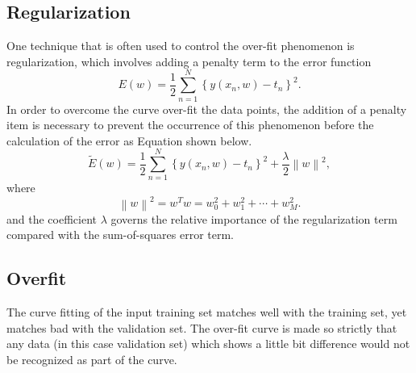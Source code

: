 \documentclass[letterpaper,12pt]{article}
\numberwithin{equation}{section}
\begin{document}



\subsection{Regularization}
One technique that is often used to control the over-fit phenomenon is regularization, which involves adding a penalty term to the error function\cite{bishop2006pattern}
\begin{equation}\label{1.1}
E(w) = \frac{1}{2}\sum_{n=1}^{N}\left\{y(x_n,w)-t_n\right\}^2.
\end{equation}
In order to overcome the curve over-fit the data points, the addition of a penalty item is necessary to prevent the occurrence of this phenomenon before the calculation of the error as Equation shown below.
\begin{equation}\label{1.2}
\widetilde{E}(w) = \frac{1}{2}\sum_{n=1}^{N}\left\{y(x_n,w)-t_n\right\}^2+\frac{\lambda}{2}{\left\|{w}\right\|}^2,
\end{equation}
where
\begin{equation}\label{1.3}
{\left\|{w}\right\|}^2=w^Tw=w_{0}^{2}+w_{1}^{2}+\cdots+w_{M}^{2}.
\end{equation}
and the coefficient $\lambda$ governs the relative importance of the regularization term compared with the sum-of-squares error term\cite{bishop2006pattern}.


\subsection{Overfit}
The curve fitting of the input training set matches well with the training set, yet matches bad with the validation set. The over-fit curve is made so strictly that any data (in this case validation set) which shows a little bit difference would not be recognized as part of the curve.
\end{document}
